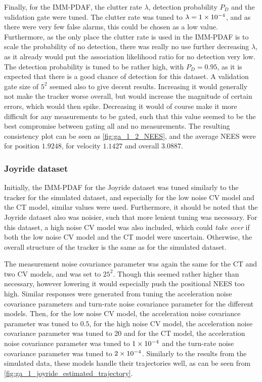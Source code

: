 Finally, for the IMM-PDAF, the clutter rate $\lambda$, detection probability $P_D$ and the validation gate were tuned. The clutter rate was tuned to $\lambda = {1} \times 10^{-4}$, and as there were very few false alarms, this could be chosen as a low value. Furthermore, as the only place the clutter rate is used in the IMM-PDAF is to scale the probability of no detection, there was really no use further decreasing $\lambda$, as it already would put the association likelihood ratio for no detection very low. The detection probability is tuned to be rather high, with $P_D = 0.95$, as it is expected that there is a good chance of detection for this dataset. A validation gate size of $5^2$ seemed also to give decent results. Increasing it would generally not make the tracker worse overall, but would increase the magnitude of certain errors, which would then spike. Decreasing it would of course make it more difficult for any measurements to be gated, such that this value seemed to be the best compromise between gating all and no measurements. The resulting consistency plot can be seen as \cref{fig:ga_1_2_NEES}, and the average NEES were for position $1.9248$, for velocity $1.1427$ and overall $3.0887$. 

\subsubsection*{Joyride dataset}
Initially, the IMM-PDAF for the Joyride dataset was tuned similarly to the tracker for the simulated dataset, and especially for the low noise CV model and the CT model, similar values were used. Furthermore, it should be noted that the Joyride dataset also was noisier, such that more lenient tuning was necessary. For this dataset, a high noise CV model was also included, which could \textit{take over} if both the low noise CV model and the CT model were uncertain. Otherwise, the overall structure of the tracker is the same as for the simulated dataset. 

The measurement noise covariance parameter was again the same for the CT and two CV models, and was set to $25^2$. Though this seemed rather higher than necessary, however lowering it would especially push the positional NEES too high. Similar responses were generated from tuning the acceleration noise covariance parameters and turn-rate noise covariance parameter for the different models. Then, for the low noise CV model, the acceleration noise covariance parameter was tuned to $0.5$, for the high noise CV model, the acceleration noise covariance parameter was tuned to $20$ and for the CT model, the acceleration noise covariance parameter was tuned to ${1} \times 10^{-4}$ and the turn-rate noise covariance parameter was tuned to ${2} \times 10^{-4}$. Similarly to the results from the simulated data, these models handle their trajectories well, as can be seen from \cref{fig:ga_1_joyride_estimated_trajectory}. 

